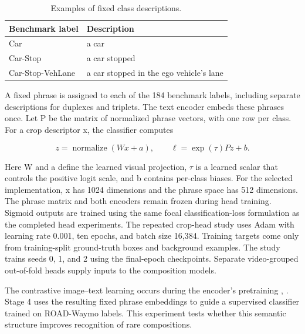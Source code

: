 \begin{table}[htbp]
\centering
\caption{Examples of fixed class descriptions.}
\label{tab:phrase-examples}
\begin{singlespace}
\begin{tabularx}{\textwidth}{@{}lX@{}}
\toprule
\textbf{Benchmark label} & \textbf{Description} \\
\midrule
Car & a car \\
Car-Stop & a car stopped \\
Car-Stop-VehLane & a car stopped in the ego vehicle's lane \\
\bottomrule
\end{tabularx}
\end{singlespace}
\end{table}


A fixed phrase is assigned to each of the 184 benchmark labels, including separate descriptions for duplexes and triplets. The text encoder embeds these phrases once. Let P be the matrix of normalized phrase vectors, with one row per class. For a crop descriptor x, the classifier computes

\begin{equation}\label{eq:phrase-classifier} z = \operatorname{normalize}(Wx+a),\qquad \ell = \exp(\tau)Pz+b. \end{equation}

Here W and a define the learned visual projection, \(\tau\) is a learned scalar that controls the positive logit scale, and b contains per-class biases. For the selected implementation, x has 1024 dimensions and the phrase space has 512 dimensions. The phrase matrix and both encoders remain frozen during head training. Sigmoid outputs are trained using the same focal classification-loss formulation as the completed head experiments. The repeated crop-head study uses Adam with learning rate 0.001, ten epochs, and batch size 16,384. Training targets come only from training-split ground-truth boxes and background examples. The study trains seeds 0, 1, and 2 using the final-epoch checkpoints. Separate video-grouped out-of-fold heads supply inputs to the composition models.

The contrastive image--text learning occurs during the encoder’s pretraining \cite{clip}, \cite{internvideo2}. Stage 4 uses the resulting fixed phrase embeddings to guide a supervised classifier trained on ROAD-Waymo labels. This experiment tests whether this semantic structure improves recognition of rare compositions.


